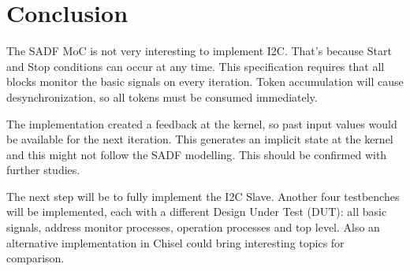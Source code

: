 \documentclass{article}
\begin{document}

\section{Conclusion} \label{sec-concl}
The SADF MoC is not very interesting to implement I2C. That's because Start and Stop conditions can occur at any time. This specification requires that all blocks monitor the basic signals on every iteration. Token accumulation will cause desynchronization, so all tokens must be consumed immediately.



The implementation created a feedback at the kernel, so past input values would be available for the next iteration. This generates an implicit state at the kernel and this might not follow the SADF modelling. This should be confirmed with further studies.

The next step will be to fully implement the I2C Slave. Another four testbenches will be implemented, each with a different Design Under Test (DUT): all basic signals, address monitor processes, operation processes and top level. Also an alternative implementation in Chisel could bring interesting topics for comparison.
\end{document}
